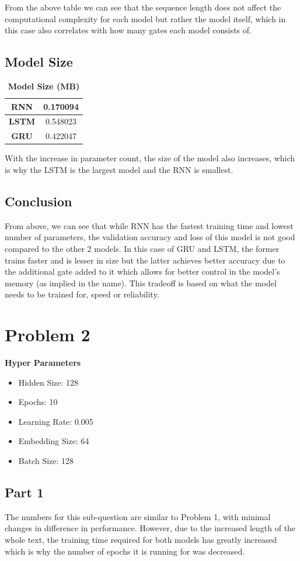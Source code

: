 \documentclass[a4paper]{article}
\begin{document}
From the above table we can see that the sequence length does not affect the computational complexity for each model but rather the model itself, which in this case also correlates with how many gates each model consists of.

\subsection*{\textbf{Model Size}}

\begin{table}[H]
    \centering
    \caption{\textbf{Model Size (MB)}}
    \label{tab:modelSize}
    \begin{tabular}{| c | c |}
        \hline
        \textbf{RNN} & 0.170094 \\
        \hline
        \textbf{LSTM} & 0.548023 \\
        \hline
        \textbf{GRU} & 0.422047 \\
        \hline
    \end{tabular}
\end{table}

With the increase in parameter count, the size of the model also increases, which is why the LSTM is the largest model and the RNN is smallest.

\subsection*{\textbf{Conclusion}}
From above, we can see that while RNN has the fastest training time and lowest number of parameters, the validation accuracy and loss of this model is not good compared to the other 2 models. In this case of GRU and LSTM, the former trains faster and is lesser in size but the latter achieves better accuracy due to the additional gate added to it which allows for better control in the model's memory (as implied in the name). This tradeoff is based on what the model needs to be trained for, speed or reliability.

\section*{\textbf{Problem 2}}

\textbf{Hyper Parameters}
\begin{itemize}
    \item Hidden Size: 128
    \item Epochs: 10
    \item Learning Rate: 0.005
    \item Embedding Size: 64
    \item Batch Size: 128
\end{itemize}

\subsection*{\textbf{{Part 1}}}
The numbers for this sub-question are similar to Problem 1, with minimal changes in difference in performance. However, due to the increased length of the whole text, the training time required for both models has greatly increased which is why the number of epochs it is running for was decreased.
\end{document}
